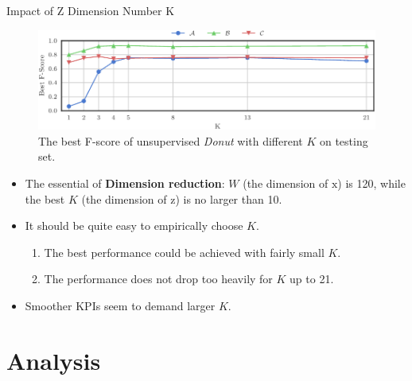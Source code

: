 \documentclass[usenames,dvipsnames]{beamer}
\newcommand{\DONUT}{\textit{Donut}}
\newcommand{\emphasis}[1]{\textbf{\textcolor{emphcolor}{#1}}}
\newcommand{\vv}[1]{\bm{\mathrm{{#1}}}}
\begin{document}
\begin{frame}{Impact of Z Dimension Number K}
  \begin{figure}
    \centering
    \includegraphics[height=.37\textheight]{z_dim_fscore_000}
	\caption{
      The best F-score of unsupervised \DONUT{} with different $K$ on testing set.
    }
  \end{figure}
  \vspace{-1em}

  \begin{itemize}\setlength\itemsep{.2em}
    \item The essential of \emphasis{Dimension reduction}: $W$ (the dimension of $\vv{x}$) is 120, while the best $K$ (the dimension of $\vv{z}$) is no larger than 10.
    \item It should be quite easy to empirically choose $K$.
      \begin{enumerate}\setlength\itemsep{0em}
        \item The best performance could be achieved with fairly small $K$.
        \item The performance does not drop too heavily for $K$ up to 21.
      \end{enumerate}
    \item Smoother KPIs seem to demand larger $K$.
  \end{itemize}
\end{frame}


\section{Analysis}
\end{document}
